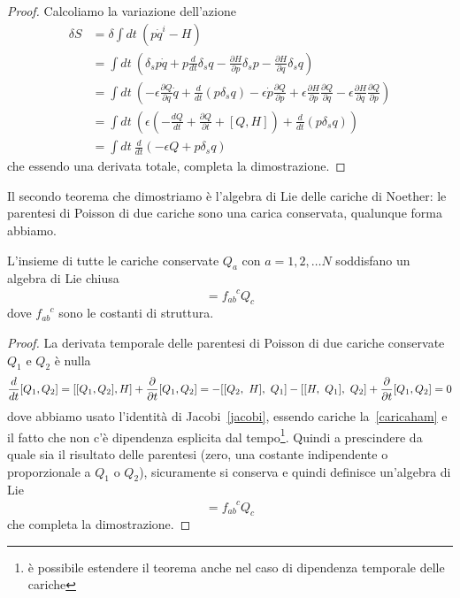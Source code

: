     \begin{proof}
        Calcoliamo la variazione dell'azione
    \begin{equation}
    \begin{aligned}
        \delta S & = \delta \int dt ~ (p \dot q^i - H) \\ & = \int dt ~  (\delta_s p \dot q + p \frac{d}{dt} \delta_s q - \frac{\partial H}{\partial p} \delta_s p - \frac{\partial H}{\partial q} \delta_s q) \\ & = \int dt ~ (- \epsilon \frac{\partial Q}{\partial q} \dot q + \frac{d}{dt} (p \delta_s q) - \epsilon \dot p \frac{\partial Q}{\partial p} + \epsilon \frac{\partial H}{\partial p} \frac{\partial Q}{\partial q} - \epsilon \frac{\partial H}{\partial q}\frac{\partial Q}{\partial p}) \\ & = \int dt ~ (\epsilon (- \frac{dQ}{dt} + \frac{\partial Q}{\partial t} + [Q, H] ) + \frac{d}{dt} (p \delta_s q)) \\ & = \int dt ~ \frac{d}{dt}(-\epsilon Q + p \delta_s q)
    \end{aligned}
    \end{equation}
        che essendo una derivata totale, completa la dimostrazione.
    \end{proof}

    Il secondo teorema che dimostriamo è l'algebra di Lie delle cariche di Noether: le parentesi di Poisson di due cariche sono una carica conservata, qualunque forma abbiamo.

    \begin{theorem}
        L'insieme di tutte le cariche conservate $Q_a$ con $a = 1, 2, \ldots N$ soddisfano un algebra di Lie chiusa
    \begin{equation*}
        [Q_a, Q_b] = f_{ab}^{\phantom{ab}c} Q_c
    \end{equation*}
        dove $f_{ab}^{\phantom{ab}c}$ sono le costanti di struttura.
    \end{theorem}

    \begin{proof}
        La derivata temporale delle parentesi di Poisson di due cariche conservate $Q_1$ e $Q_2$ è nulla
    \begin{equation*}
        \frac{d}{dt} [Q_1, Q_2] = [[Q_1, Q_2], H] + \frac{\partial}{\partial t} [Q_1, Q_2] = - [[Q_2, ~H], ~Q_1] - [[H, ~Q_1], ~Q_2] + \frac{\partial}{\partial t} [Q_1, Q_2] = 0
    \end{equation*} 
        dove abbiamo usato l'identità di Jacobi~\eqref{jacobi}, essendo cariche la~\eqref{caricaham} e il fatto che non c'è dipendenza esplicita dal tempo\footnote{è possibile estendere il teorema anche nel caso di dipendenza temporale delle cariche}. Quindi a prescindere da quale sia il risultato delle parentesi (zero, una costante indipendente o proporzionale a $Q_1$ o $Q_2$), sicuramente si conserva e quindi definisce un'algebra di Lie
    \begin{equation*}
        [Q_a, Q_b] = f_{ab}^{\phantom{ab}c} Q_c
    \end{equation*}
        che completa la dimostrazione.
    \end{proof}

